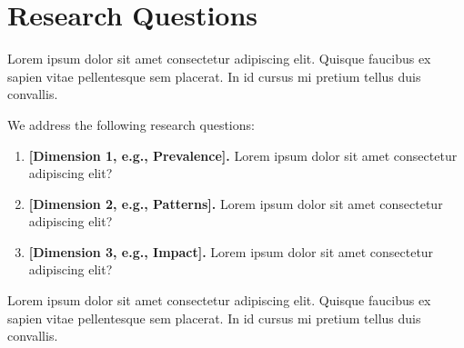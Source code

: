 \documentclass[sigconf,nonacm]{acmart} %
\begin{document}
\section{Research Questions}
\label{sec:research_questions}

Lorem ipsum dolor sit amet consectetur adipiscing elit. 
Quisque faucibus ex sapien vitae pellentesque sem placerat.
In id cursus mi pretium tellus duis convallis. 

\noindent We address the following research questions:
\begin{enumerate}[label=\textbf{RQ\arabic*}:, leftmargin=*]
    \item \textbf{[Dimension 1, e.g., Prevalence].} Lorem ipsum dolor sit amet consectetur adipiscing elit?
    \item \textbf{[Dimension 2, e.g., Patterns].} Lorem ipsum dolor sit amet consectetur adipiscing elit?
    \item \textbf{[Dimension 3, e.g., Impact].} Lorem ipsum dolor sit amet consectetur adipiscing elit?
\end{enumerate}

Lorem ipsum dolor sit amet consectetur adipiscing elit. 
Quisque faucibus ex sapien vitae pellentesque sem placerat.
In id cursus mi pretium tellus duis convallis. 

\end{document}
